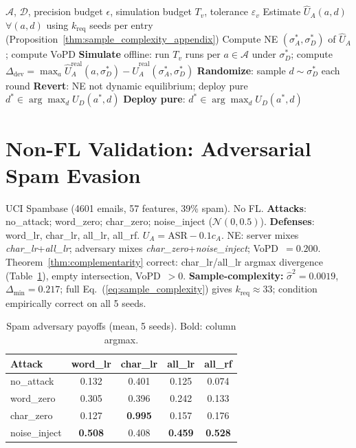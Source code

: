 \documentclass{article}
\newcommand{\UA}{U_A}
\newcommand{\UD}{U_D}
\begin{document}
\begin{algorithm}[h]
\caption{Measure-Then-Verify-Then-Randomize}\label{alg:mtr}
\small
\begin{algorithmic}[1]
\REQUIRE $\mathcal{A}$, $\mathcal{D}$, precision budget $\epsilon$, simulation budget $T_v$, tolerance $\varepsilon_v$
\STATE Estimate $\hat{U}_A(a,d)$ $\forall (a,d)$ using $k_{\mathrm{req}}$ seeds per entry (Proposition~\ref{thm:sample_complexity_appendix})
\STATE Compute NE $(\sigma_A^*, \sigma_D^*)$ of $\hat{U}_A$; compute VoPD
    \STATE \textbf{Simulate} offline: run $T_v$ runs per $a \in \mathcal{A}$ under $\sigma_D^*$; compute $\Delta_{\mathrm{dev}} = \max_a \hat{U}_A^{\mathrm{real}}(a,\sigma_D^*) - \hat{U}_A^{\mathrm{real}}(\sigma_A^*, \sigma_D^*)$
        \STATE \textbf{Randomize}: sample $d \sim \sigma_D^*$ each round
    \ELSE
        \STATE \textbf{Revert}: NE not dynamic equilibrium; deploy pure $d^* \in \arg\max_d \UD(a^*, d)$
    \ENDIF
\ELSE
    \STATE \textbf{Deploy pure}: $d^* \in \arg\max_d \UD(a^*, d)$
\ENDIF
\end{algorithmic}
\end{algorithm}


\section{Non-FL Validation: Adversarial Spam Evasion}
\label{app:spam}

UCI Spambase (4601 emails, 57 features, 39\% spam). No FL. \textbf{Attacks}: no\_attack; word\_zero; char\_zero; noise\_inject ($\mathcal{N}(0,0.5)$). \textbf{Defenses}: word\_lr, char\_lr, all\_lr, all\_rf. $\UA=\text{ASR}-0.1c_A$. NE: server mixes \emph{char\_lr}+\emph{all\_lr}; adversary mixes \emph{char\_zero}+\emph{noise\_inject}; VoPD~$= 0.200$. Theorem~\ref{thm:complementarity} correct: char\_lr/all\_lr argmax divergence (Table~\ref{tab:spam_payoff}), empty intersection, VoPD~$>0$. \textbf{Sample-complexity:} $\hat{\sigma}^2=0.0019$, $\Delta_{\min}=0.217$; full Eq.~(\ref{eq:sample_complexity}) gives $k_{\text{req}}\approx 33$; condition empirically correct on all 5 seeds.

\begin{table}[!htb]
\caption{Spam adversary payoffs (mean, 5 seeds). Bold: column argmax.}
\label{tab:spam_payoff}
\centering
\footnotesize
\begin{tabular}{lcccc}
\toprule
Attack & word\_lr & char\_lr & all\_lr & all\_rf \\
\midrule
no\_attack    & 0.132 & 0.401 & 0.125 & 0.074 \\
word\_zero    & 0.305 & 0.396 & 0.242 & 0.133 \\
char\_zero    & 0.127 & \textbf{0.995} & 0.157 & 0.176 \\
noise\_inject & \textbf{0.508} & 0.408 & \textbf{0.459} & \textbf{0.528} \\
\bottomrule
\end{tabular}
\end{table}
\end{document}
